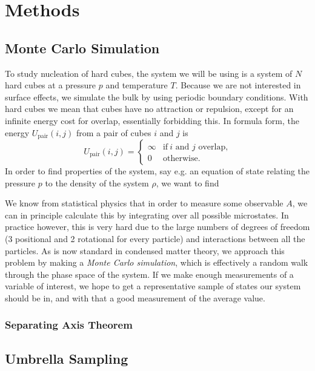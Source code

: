 \documentclass[thesis]{subfiles}
\begin{document}
\section{Methods}

\subsection{Monte Carlo Simulation}

To study nucleation of hard cubes, the system we will be using is a system of $N$ hard cubes at a pressure $p$ and temperature $T$. Because we are not interested in surface effects, we simulate the bulk by using periodic boundary conditions. With hard cubes we mean that cubes have no attraction or repulsion, except for an infinite energy cost for overlap, essentially forbidding this. In formula form, the energy $U_{\textrm{pair}}(i,j)$ from a pair of cubes $i$ and $j$ is
\begin{equation}
U_{\textrm{pair}}(i,j) = 
\begin{cases}
\infty & \text{if}\ i \text{ and } j \text{ overlap,}\\
0 & \text{otherwise.}
\end{cases}
\end{equation}
In order to find properties of the system, say e.g. an equation of state relating the pressure $p$ to the density of the system $\rho$, we want to find

We know from statistical physics  that in order to measure some observable $A$, we can in principle calculate this by integrating over all possible microstates. In practice however, this is very hard due to the large numbers of degrees of freedom (3 positional and 2 rotational for every particle) and interactions between all the particles. As is now standard in condensed matter theory, we approach this problem by making a \emph{Monte Carlo simulation}, which is effectively a random walk through the phase space of the system. If we make enough measurements of a variable of interest, we hope to get a representative sample of states our system should be in, and with that a good measurement of the average value. 

\subsubsection{Separating Axis Theorem}

\subsection{Umbrella Sampling}
\end{document}
